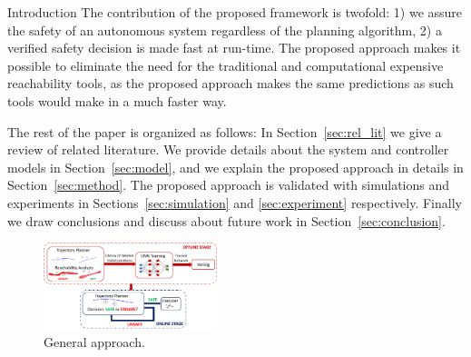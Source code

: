 \begin{section}{Introduction}
The contribution of the proposed framework is twofold: 1) we assure the safety of an autonomous system regardless of the planning algorithm, 2) a verified safety decision is made fast at run-time. The proposed approach makes it possible to eliminate the need for the traditional and computational expensive reachability tools, as the proposed approach makes the same predictions as such tools would make in a much faster way.

The rest of the paper is organized as follows: In Section~\ref{sec:rel_lit} we give a review of related literature. We provide details about the system and controller models in Section~\ref{sec:model}, and we explain the proposed approach in details in Section~\ref{sec:method}. The proposed approach is validated with simulations and experiments in Sections~\ref{sec:simulation} and \ref{sec:experiment} respectively. Finally we draw conclusions and discuss about future work in Section~\ref{sec:conclusion}.

\begin{figure}[t]
	\centering
	\includegraphics[width=0.45\textwidth]{figures/general_approach}
	\caption{General approach.} 
	\label{fig:gen_app}
\end{figure}
\end{section}

